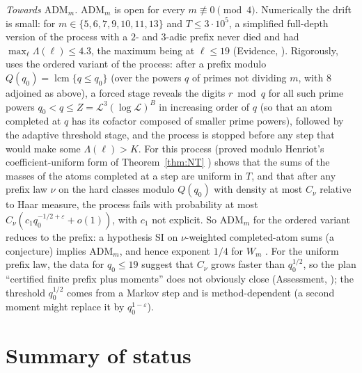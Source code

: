 \documentclass[11pt,reqno]{amsart}
\theoremstyle{definition}
\newcommand{\lcm}{\operatorname{lcm}}
\newcommand{\Lc}{\mathcal L}
\begin{document}
\emph{Towards $\mathrm{ADM}_m$.}  $\mathrm{ADM}_m$ is open for every $m\not\equiv0\pmod4$.
Numerically the drift is small: for $m\in\{5,6,7,9,10,11,13\}$ and
$T\le3\cdot10^5$, a simplified full-depth version of the process with a $2$- and
$3$-adic prefix never died and had $\max_\ell\Lambda(\ell)\le4.3$, the maximum being at
$\ell\le19$ (Evidence, \cite[\S6]{MN}).  Rigorously, \cite{MN2} uses the ordered variant of the process: after a
prefix modulo $Q(q_0)=\lcm\{q\le q_0\}$ (over the powers $q$ of primes not dividing
$m$, with $8$ adjoined as above), a forced stage reveals the digits $r\bmod q$ for all such prime powers
$q_0<q\le Z=\Lc^3(\log\Lc)^B$ in increasing order of $q$ (so that an atom completed at
$q$ has its cofactor composed of smaller prime powers), followed by the
adaptive threshold stage, and the process is stopped before any step that
would make some $\Lambda(\ell)>K$.  For this process \cite[Thm.~3.1]{MN2} (proved
modulo Henriot's coefficient-uniform form of Theorem~\ref{thm:NT}
\cite[Thm.~5]{Henriot}) shows that the sums of the masses of the atoms
completed at a step are uniform in $T$, and that after any prefix law $\nu$ on
the hard classes modulo $Q(q_0)$ with density at most $C_\nu$ relative to Haar
measure, the process fails with probability at most
$C_\nu(c_1q_0^{-1/2+\varepsilon}+o(1))$, with $c_1$ not explicit.  So $\mathrm{ADM}_m$ for the ordered variant reduces to the prefix: a hypothesis SI on
$\nu$-weighted completed-atom sums (a conjecture) implies $\mathrm{ADM}_m$, and hence
exponent $1/4$ for $W_m$ \cite[Prop.~5.1]{MN2}.  For the uniform prefix law,
the data for $q_0\le19$ suggest that $C_\nu$ grows faster than $q_0^{1/2}$, so the
plan ``certified finite prefix plus moments'' does not obviously close
(Assessment, \cite[\S4]{MN2}); the threshold $q_0^{1/2}$ comes from a Markov step
and is method-dependent (a second moment might replace it by $q_0^{1-\varepsilon}$).

\section{Summary of status}\label{sec:status}
\end{document}
